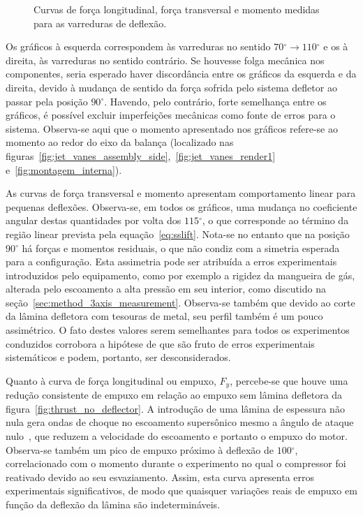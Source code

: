 \begin{figure}[htbp]
\begin{subfigure}{0.49\textwidth}
    \end{subfigure}
    \caption{Curvas de força longitudinal, força transversal e momento medidas para as varreduras de deflexão.}\label{fig:deflection_forces}
\end{figure}

Os gráficos à esquerda correspondem às varreduras no sentido \(70\mathrm{^{\circ}} \rightarrow 110\mathrm{^\circ}\) e os à direita, às varreduras no sentido contrário. Se houvesse folga mecânica nos componentes, seria esperado haver discordância entre os gráficos da esquerda e da direita, devido à mudança de sentido da força sofrida pelo sistema defletor ao passar pela posição \(90\mathrm{^{\circ}}\). Havendo, pelo contrário, forte semelhança entre os gráficos, é possível excluir imperfeições mecânicas como fonte de erros para o sistema. Observa-se aqui que o momento apresentado nos gráficos refere-se ao momento ao redor do eixo da balança (localizado nas figuras~\ref{fig:jet_vanes_assembly_side},~\ref{fig:jet_vanes_render1} e~\ref{fig:montagem_interna}).

As curvas de força transversal e momento apresentam comportamento linear para pequenas deflexões. Observa-se, em todos os gráficos, uma mudança no coeficiente angular destas quantidades por volta dos \(115\mathrm{^{\circ}}\), o que corresponde ao término da região linear prevista pela equação~\ref{eq:sslift}. Nota-se no entanto que na posição \(90\mathrm{^\circ}\) há forças e momentos residuais, o que não condiz com a simetria esperada para a configuração. Esta assimetria pode ser atribuída a erros experimentais introduzidos pelo equipamento, como por exemplo a rigidez da mangueira de gás, alterada pelo escoamento a alta pressão em seu interior, como discutido na seção~\ref{sec:method_3axis_measurement}. Observa-se também que devido ao corte da lâmina defletora com tesouras de metal, seu perfil também é um pouco assimétrico. O fato destes valores serem semelhantes para todos os experimentos conduzidos corrobora a hipótese de que são fruto de erros experimentais sistemáticos e podem, portanto, ser desconsiderados.

Quanto à curva de força longitudinal ou empuxo, \(F_y\), percebe-se que houve uma redução consistente de empuxo em relação ao empuxo sem lâmina defletora da figura~\ref{fig:thrust_no_deflector}. A introdução de uma lâmina de espessura não nula gera ondas de choque no escoamento supersônico mesmo a ângulo de ataque nulo~\cite{anderson}, que reduzem a velocidade do escoamento e portanto o empuxo do motor. Observa-se também um pico de empuxo próximo à deflexão de \(100\mathrm{^\circ}\), correlacionado com o momento durante o experimento no qual o compressor foi reativado devido ao seu esvaziamento. Assim, esta curva apresenta erros experimentais significativos, de modo que quaisquer variações reais de empuxo em função da deflexão da lâmina são indetermináveis.


